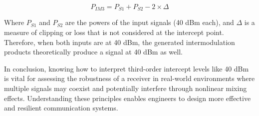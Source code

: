 \[
P_{IM3} = P_{S1} + P_{S2} - 2 \times \Delta
\]

Where \( P_{S1} \) and \( P_{S2} \) are the powers of the input signals (40 dBm each), and \( \Delta \) is a measure of clipping or loss that is not considered at the intercept point. Therefore, when both inputs are at 40 dBm, the generated intermodulation products theoretically produce a signal at 40 dBm as well.




In conclusion, knowing how to interpret third-order intercept levels like 40 dBm is vital for assessing the robustness of a receiver in real-world environments where multiple signals may coexist and potentially interfere through nonlinear mixing effects. Understanding these principles enables engineers to design more effective and resilient communication systems.